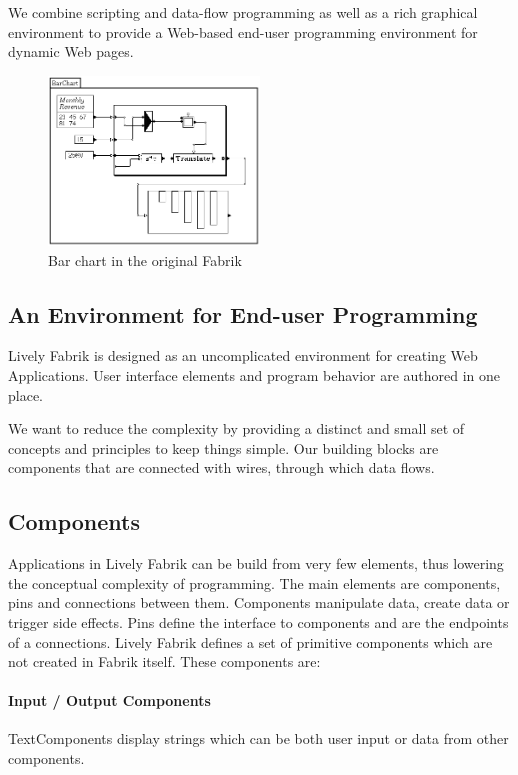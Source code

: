 \documentclass[pdftex, times, 10pt, twocolumn]{article}
\begin{document}
We combine scripting and data-flow programming as well as a rich graphical environment to provide a Web-based end-user programming environment for dynamic Web pages.  



\begin{figure}[]\centering
\includegraphics[width=0.500000\textwidth]{Fabrik_figure6.png} 

\caption{Bar chart in the original Fabrik ~\cite{Ingalls1988FVP} }
\label{fig:FabrikBarChart}
\end{figure}


\subsection{An Environment for End-user Programming}
Lively Fabrik is designed as an uncomplicated environment for creating Web Applications. User interface elements and program behavior are authored in one place.  

We want to reduce the complexity by providing a distinct and small set of concepts and principles to keep things simple. Our building blocks are components that are connected with wires, through which data flows.  



\subsection{Components}
Applications in Lively Fabrik can be build from very few elements, thus lowering the conceptual complexity of programming. The main elements are components, pins and connections between them. Components manipulate data, create data or trigger side effects. Pins define the interface to components and are the endpoints of a connections. Lively Fabrik defines a set of primitive components which are not created in Fabrik itself. These components are: 



\paragraph{Input / Output Components}
TextComponents display strings which can be both user input or data from other components. 
\end{document}
